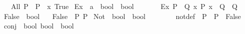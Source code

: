 \begin{isabellebody}
\ \ \ {\isachardoublequoteopen}All\ P\ {\isasymequiv}\ {\isacharparenleft}{\kern0pt}P\ {\isacharequal}{\kern0pt}\ {\isacharparenleft}{\kern0pt}{\isasymlambda}x{\isachardot}{\kern0pt}\ True{\isacharparenright}{\kern0pt}{\isacharparenright}{\kern0pt}{\isachardoublequoteclose}\isanewline
\isanewline
{}\isamarkupfalse%
\ Ex\ {\isacharcolon}{\kern0pt}{\isacharcolon}{\kern0pt}\ {\isachardoublequoteopen}{\isacharparenleft}{\kern0pt}{\isacharprime}{\kern0pt}a\ {\isasymRightarrow}\ bool{\isacharparenright}{\kern0pt}\ {\isasymRightarrow}\ bool{\isachardoublequoteclose}\ \ {\isacharparenleft}{\kern0pt}\ {\isachardoublequoteopen}{\isasymexists}{\isachardoublequoteclose}\ {}{}{\isacharparenright}{\kern0pt}\isanewline
\ \ \ {\isachardoublequoteopen}Ex\ P\ {\isasymequiv}\ {\isasymforall}Q{\isachardot}{\kern0pt}\ {\isacharparenleft}{\kern0pt}{\isasymforall}x{\isachardot}{\kern0pt}\ P\ x\ {\isasymlongrightarrow}\ Q{\isacharparenright}{\kern0pt}\ {\isasymlongrightarrow}\ Q{\isachardoublequoteclose}\isanewline
\isanewline
{}\isamarkupfalse%
\ False\ {\isacharcolon}{\kern0pt}{\isacharcolon}{\kern0pt}\ bool\isanewline
\ \ \ {\isachardoublequoteopen}False\ {\isasymequiv}\ {\isacharparenleft}{\kern0pt}{\isasymforall}P{\isachardot}{\kern0pt}\ P{\isacharparenright}{\kern0pt}{\isachardoublequoteclose}\isanewline
\isanewline
{}\isamarkupfalse%
\ Not\ {\isacharcolon}{\kern0pt}{\isacharcolon}{\kern0pt}\ {\isachardoublequoteopen}bool\ {\isasymRightarrow}\ bool{\isachardoublequoteclose}\ \ {\isacharparenleft}{\kern0pt}{\isachardoublequoteopen}{\isasymnot}\ {\isacharunderscore}{\kern0pt}{\isachardoublequoteclose}\ {\isacharbrackleft}{\kern0pt}{}{}{\isacharbrackright}{\kern0pt}\ {}{}{\isacharparenright}{\kern0pt}\isanewline
\ \ \ not{\isacharunderscore}{\kern0pt}def{\isacharcolon}{\kern0pt}\ {\isachardoublequoteopen}{\isasymnot}\ P\ {\isasymequiv}\ P\ {\isasymlongrightarrow}\ False{\isachardoublequoteclose}\isanewline
\isanewline
{}\isamarkupfalse%
\ conj\ {\isacharcolon}{\kern0pt}{\isacharcolon}{\kern0pt}\ {\isachardoublequoteopen}{\isacharbrackleft}{\kern0pt}bool{\isacharcomma}{\kern0pt}\ bool{\isacharbrackright}{\kern0pt}\ {\isasymRightarrow}\ bool{\isachardoublequoteclose}\ \ {\isacharparenleft}{\kern0pt}\ {\isachardoublequoteopen}{\isasymand}{\isachardoublequoteclose}\ {}{}{\isacharparenright}{\kern0pt}\isanewline

\end{isabellebody}
